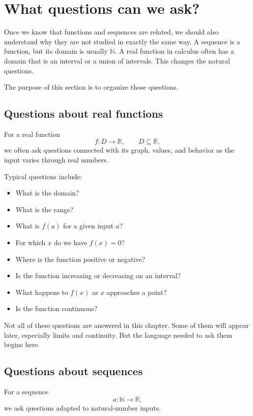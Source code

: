 \section{What questions can we ask?}

Once we know that functions and sequences are related, we should also understand why they are not studied in exactly the same way. A sequence is a function, but its domain is usually \(\mathbb{N}\). A real function in calculus often has a domain that is an interval or a union of intervals. This changes the natural questions.

The purpose of this section is to organize those questions.

\subsection*{Questions about real functions}

For a real function
\[
f:D\to\mathbb{R},
\qquad
D\subseteq\mathbb{R},
\]
we often ask questions connected with its graph, values, and behavior as the input varies through real numbers.

Typical questions include:
\begin{itemize}
\item What is the domain?
\item What is the range?
\item What is \(f(a)\) for a given input \(a\)?
\item For which \(x\) do we have \(f(x)=0\)?
\item Where is the function positive or negative?
\item Is the function increasing or decreasing on an interval?
\item What happens to \(f(x)\) as \(x\) approaches a point?
\item Is the function continuous?
\end{itemize}

Not all of these questions are answered in this chapter. Some of them will appear later, especially limits and continuity. But the language needed to ask them begins here.

\subsection*{Questions about sequences}

For a sequence
\[
a:\mathbb{N}\to\mathbb{R},
\]
we ask questions adapted to natural-number inputs.

